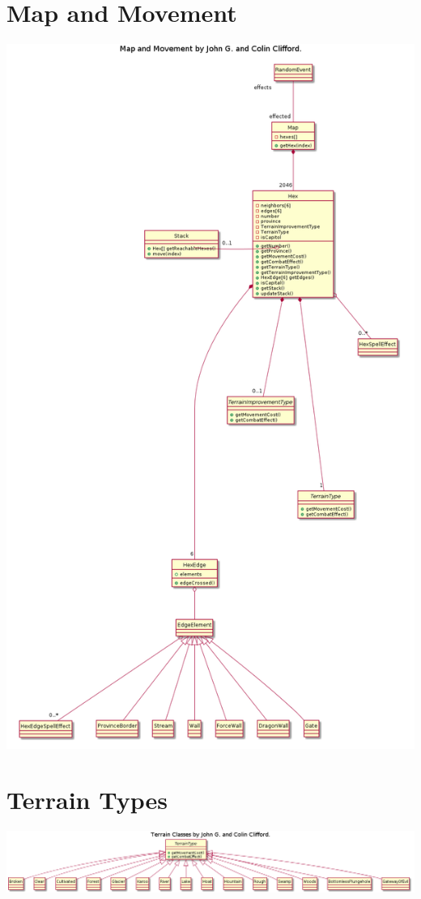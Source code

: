 \documentclass{article}
\begin{document}
\section{Map and Movement}
\includegraphics[width=\textwidth]{pngs/Map.png}

\section{Terrain Types}
\includegraphics[width=\textwidth]{pngs/TerrainClasses.png}
\end{document}
